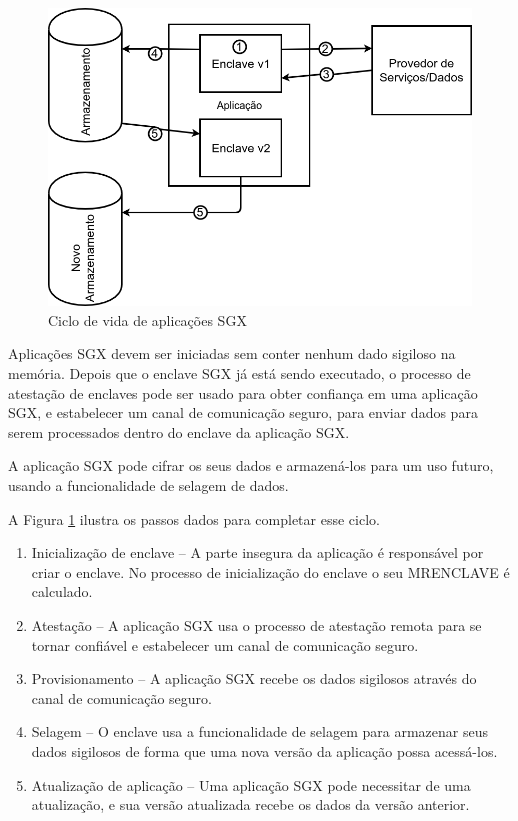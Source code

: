 \begin{figure}[ht]
\centering
\includegraphics[width=5in]{img/ciclovida_sgx}
\caption{Ciclo de vida de aplicações SGX}
\label{fig:ciclovida}
\end{figure}

Aplicações SGX devem ser iniciadas sem conter nenhum dado sigiloso na memória.
Depois que o enclave SGX já está sendo executado, o processo de atestação de
enclaves pode ser usado para obter confiança em uma aplicação SGX, e estabelecer
um canal de comunicação seguro, para enviar dados para serem processados dentro
do enclave da aplicação SGX.

A aplicação SGX pode cifrar os seus dados e armazená-los para um uso futuro,
usando a funcionalidade de selagem de dados.

A Figura \ref{fig:ciclovida} ilustra os passos dados para completar esse ciclo.

\begin{enumerate}
    \item Inicialização de enclave -- A parte insegura da aplicação é
    responsável por criar o enclave. No processo de inicialização do enclave o
    seu MRENCLAVE é calculado.

    \item Atestação -- A aplicação SGX usa o processo de atestação remota para
    se tornar confiável e estabelecer um canal de comunicação seguro.

    \item Provisionamento -- A aplicação SGX recebe os dados sigilosos através
    do canal de comunicação seguro.

    \item Selagem -- O enclave usa a funcionalidade de selagem para armazenar
    seus dados sigilosos de forma que uma nova versão da aplicação possa
    acessá-los.

    \item Atualização de aplicação -- Uma aplicação SGX pode necessitar de uma
    atualização, e sua versão atualizada recebe os dados da versão anterior.

\end{enumerate}

